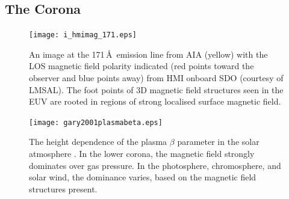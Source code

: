 
\subsection{The Corona}\label{sect:corona}

\begin{figure}[!h]
\centerline{\texttt{[image: i\_hmimag\_171.eps]}}
\caption[A image in EUV with the magnetic polarities indicated.]{An image at the 171\,\AA\ emission line from AIA (yellow) with the LOS magnetic field polarity indicated (red points toward the observer and blue points away) from HMI onboard SDO (courtesy of LMSAL). The foot points of 3D magnetic field structures seen in the EUV are rooted in regions of strong localised surface magnetic field.}
\label{fig:coronamag}
\end{figure}

\begin{figure}[!h]
\centerline{\texttt{[image: gary2001plasmabeta.eps]}}
\caption[The height dependence of the plasma $\beta$ parameter in the solar atmosphere.]{The height dependence of the plasma $\beta$ parameter in the solar atmosphere \citep[from][]{Gary:2001}. In the lower corona, the magnetic field strongly dominates over gas pressure. In the photosphere, chromosphere, and solar wind, the dominance varies, based on the magnetic field structures present.}
\label{fig:plasbeta}
\end{figure}

